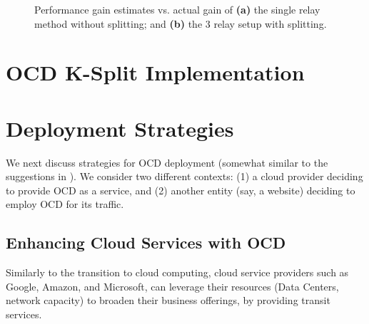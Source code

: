 \documentclass[newfonts=false,format=sigconf,anonymous,10pt,letterpaper]{acmart}
\providecommand{\vs}{vs. }
\newcommand{\ksplit}{K-Split\xspace}
\begin{document}
\begin{figure}[t]
\begin{subfigure}{0.47\columnwidth}
    \caption{} \label{fig:rtt-estimate-ssh-3hop}
\end{subfigure}
    \caption{Performance gain estimates \vs actual gain of \textbf{(a)} the single relay method without splitting; and \textbf{(b)} the 3 relay setup with splitting.}
\end{figure}




\section{OCD \ksplit Implementation}\label{sec:implementation}




\section{Deployment Strategies}\label{sec:deployment}

We next discuss strategies for OCD deployment (somewhat similar to the suggestions in \cite{pucha2005slot}). We consider two different contexts: (1) a cloud provider deciding to provide OCD as a service, and (2) another entity (say, a website) deciding to employ OCD for its traffic. 

\subsection{Enhancing Cloud Services with OCD}\label{subsec:enhancing-w-ocd}

Similarly to the transition to cloud computing, cloud service providers such as Google, Amazon, and Microsoft, can leverage their resources (Data Centers, network capacity) to broaden their business offerings, by providing transit services.
\end{document}
